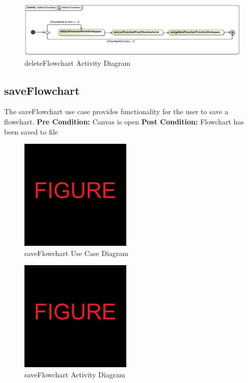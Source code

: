 \documentclass[11pt,a4paper,titlepage]{article}
\begin{document}
\begin{figure}[H]
  \centering
\includegraphics[width=500px]{deleteFlowchartActivity.eps}
\caption{deleteFlowchart Activity Diagram}
\end{figure}

\newpage
\subsection{saveFlowchart}
The saveFlowchart use case provides functionality for the user to save a flowchart.\newline\newline
\textbf{Pre Condition:} Canvas is open\newline\newline
\textbf{Post Condition:} Flowchart has been saved to file

\begin{figure}[H]
  \centering
\includegraphics[width=200px]{figure.jpg}
\caption{saveFlowchart Use Case Diagram}
\end{figure}

\begin{figure}[H]
  \centering
\includegraphics[width=200px]{figure.jpg}
\caption{saveFlowchart Activity Diagram}
\end{figure}
\end{document}
